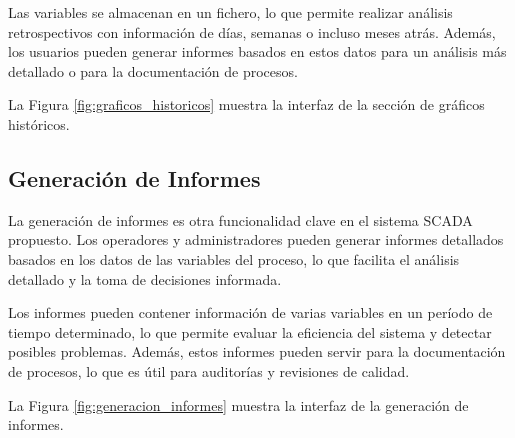 Las variables se almacenan en un fichero, lo que permite realizar análisis retrospectivos con información de días, semanas o incluso meses atrás. Además, los usuarios pueden generar informes basados en estos datos para un análisis más detallado o para la documentación de procesos.

La Figura \ref{fig:graficos_historicos} muestra la interfaz de la sección de gráficos históricos.


\subsection{Generación de Informes}

La generación de informes es otra funcionalidad clave en el sistema SCADA propuesto. Los operadores y administradores pueden generar informes detallados basados en los datos de las variables del proceso, lo que facilita el análisis detallado y la toma de decisiones informada.

Los informes pueden contener información de varias variables en un período de tiempo determinado, lo que permite evaluar la eficiencia del sistema y detectar posibles problemas. Además, estos informes pueden servir para la documentación de procesos, lo que es útil para auditorías y revisiones de calidad.

La Figura \ref{fig:generacion_informes} muestra la interfaz de la generación de informes.








